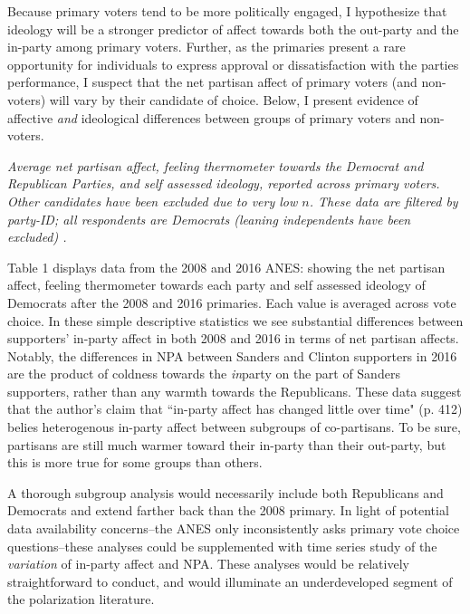 \documentclass[12pt]{article}
\begin{document}
Because primary voters tend to be more politically engaged, I hypothesize that ideology will be a stronger predictor of affect towards both the out-party and the in-party among primary voters. Further, as the primaries present a rare opportunity for individuals to express approval or dissatisfaction with the parties performance, I suspect that the net partisan affect of primary voters (and non-voters) will vary by their candidate of choice. Below, I present evidence of affective \textit{and} ideological differences between groups of primary voters and non-voters.


 \begin{table}[h!]

\caption{\label{table} \textit{Average net partisan affect, feeling thermometer towards the Democrat and Republican Parties, and self assessed ideology, reported across primary voters. Other candidates have been excluded due to very low $n$. These data are filtered by party-ID; all respondents are Democrats (leaning independents have been excluded)
.}}
\end{table}

Table 1 displays data from the 2008 and 2016 ANES: showing the net partisan affect, feeling thermometer towards each party and self assessed ideology of Democrats after the 2008 and 2016 primaries. Each value is averaged across vote choice. In these simple descriptive statistics we see substantial differences between supporters' in-party affect in both 2008 and 2016 in terms of net partisan affects. Notably, the differences in NPA between Sanders and Clinton supporters in 2016 are the product of coldness towards the \textit{in}party on the part of Sanders supporters, rather than any warmth towards the Republicans. These data suggest that the author's claim that ``in-party affect has changed little over time" (p. 412) belies heterogenous in-party affect between subgroups of co-partisans. To be sure, partisans are still much warmer toward their in-party than their out-party, but this is more true for some groups than others. 

A thorough subgroup analysis would necessarily include both Republicans and Democrats and extend farther back than the 2008 primary. In light of potential data availability concerns--the ANES only inconsistently asks primary vote choice questions--these analyses could be supplemented with time series study of the \textit{variation} of in-party affect and NPA. These analyses would be relatively straightforward to conduct, and would illuminate an underdeveloped segment of the polarization literature.
\end{document}
